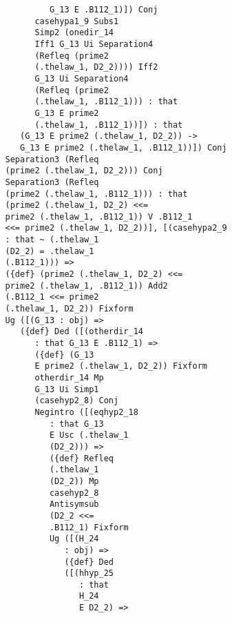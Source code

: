 \documentclass[12pt]{article}
\begin{document}
\begin{verbatim}
                               G_13 E .B112_1)]) Conj 
                            casehypa1_9 Subs1 
                            Simp2 (onedir_14 
                            Iff1 G_13 Ui Separation4 
                            (Refleq (prime2 
                            (.thelaw_1, D2_2)))) Iff2 
                            G_13 Ui Separation4 
                            (Refleq (prime2 
                            (.thelaw_1, .B112_1))) : that 
                            G_13 E prime2 
                            (.thelaw_1, .B112_1))]) : that 
                         (G_13 E prime2 (.thelaw_1, D2_2)) -> 
                         G_13 E prime2 (.thelaw_1, .B112_1))]) Conj 
                      Separation3 (Refleq 
                      (prime2 (.thelaw_1, D2_2))) Conj 
                      Separation3 (Refleq 
                      (prime2 (.thelaw_1, .B112_1))) : that 
                      (prime2 (.thelaw_1, D2_2) <<= 
                      prime2 (.thelaw_1, .B112_1)) V .B112_1 
                      <<= prime2 (.thelaw_1, D2_2))], [(casehypa2_9 
                      : that ~ (.thelaw_1 
                      (D2_2) = .thelaw_1 
                      (.B112_1))) => 
                      ({def} (prime2 (.thelaw_1, D2_2) <<= 
                      prime2 (.thelaw_1, .B112_1)) Add2 
                      (.B112_1 <<= prime2 
                      (.thelaw_1, D2_2)) Fixform 
                      Ug ([(G_13 : obj) => 
                         ({def} Ded ([(otherdir_14 
                            : that G_13 E .B112_1) => 
                            ({def} (G_13 
                            E prime2 (.thelaw_1, D2_2)) Fixform 
                            otherdir_14 Mp 
                            G_13 Ui Simp1 
                            (casehyp2_8) Conj 
                            Negintro ([(eqhyp2_18 
                               : that G_13 
                               E Usc (.thelaw_1 
                               (D2_2))) => 
                               ({def} Refleq 
                               (.thelaw_1 
                               (D2_2)) Mp 
                               casehyp2_8 
                               Antisymsub 
                               (D2_2 <<= 
                               .B112_1) Fixform 
                               Ug ([(H_24 
                                  : obj) => 
                                  ({def} Ded 
                                  ([(hhyp_25 
                                     : that 
                                     H_24 
                                     E D2_2) => 

\end{verbatim}
\end{document}
